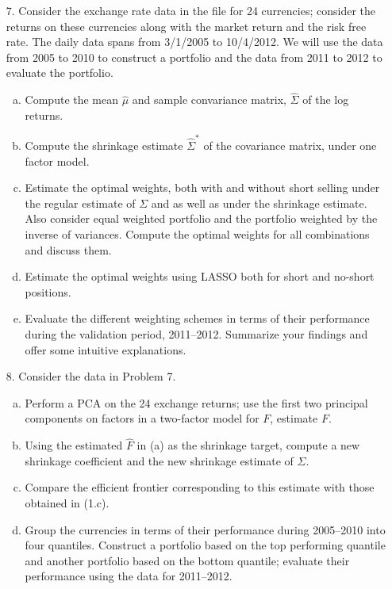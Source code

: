 \begin{enumerate}
    


\item[7.] Consider the exchange rate data in the file  for 24 currencies; consider the returns on these currencies along with the market return and the risk free rate. The daily data spans from 3/1/2005 to 10/4/2012. We will use the data from 2005 to 2010 to construct a portfolio and the data from 2011 to 2012 to evaluate the portfolio.
	\begin{enumerate}[(a)]
	\item Compute the mean $\hat{\mu}$ and sample convariance matrix, $\hat{\Sigma}$ of the log returns.
	\item Compute the shrinkage estimate $\hat{\Sigma}^*$ of the covariance matrix, under one factor model.
	\item Estimate the optimal weights, both with and without short selling under the regular estimate of $\Sigma$ and as well as under the shrinkage estimate. Also consider equal weighted portfolio and the portfolio weighted by the inverse of variances. Compute the optimal weights for all combinations and discuss them.
	\item Estimate the optimal weights using LASSO both for short and no-short positions.
	\item Evaluate the different weighting schemes in terms of their performance during the validation period, 2011--2012. Summarize your findings and offer some intuitive explanations.
	\end{enumerate}
    
    
\item[8.] Consider the data in Problem 7.
	\begin{enumerate}[(a)]
	\item Perform a PCA on the 24 exchange returns; use the first two principal components on factors in a two-factor model for $F$, estimate $F$.
	\item Using the estimated $\hat{F}$ in (a) as the shrinkage target, compute a new shrinkage coefficient and the new shrinkage estimate of $\Sigma$. 
	\item Compare the efficient frontier corresponding to this estimate with those obtained in (1.c). 
	\item Group the currencies in terms of their performance during 2005--2010 into four quantiles. Construct a portfolio based on the top performing quantile and another portfolio based on the bottom quantile; evaluate their performance using the data for 2011--2012.
	\end{enumerate}





\end{enumerate}
